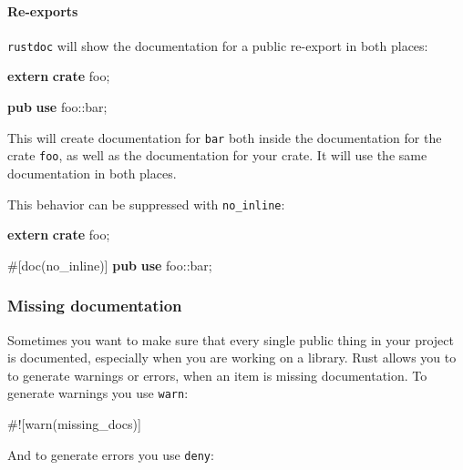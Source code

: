\documentclass[a4paper,]{book}
\newenvironment{Shaded}{\begin{snugshade}}{\end{snugshade}}
\newcommand{\KeywordTok}[1]{\textcolor[rgb]{0.13,0.29,0.53}{\textbf{{#1}}}}
\newcommand{\AttributeTok}[1]{\textcolor[rgb]{0.77,0.63,0.00}{{#1}}}
\newcommand{\NormalTok}[1]{{#1}}
\let\oldparagraph\paragraph
\renewcommand{\paragraph}[1]{\oldparagraph{#1}\mbox{}}
\begin{document}
\paragraph{Re-exports}\label{re-exports}

\texttt{rustdoc} will show the documentation for a public re-export in
both places:

\begin{Shaded}
\begin{Highlighting}[]
\KeywordTok{extern} \KeywordTok{crate} \NormalTok{foo;}

\KeywordTok{pub} \KeywordTok{use} \NormalTok{foo::bar;}
\end{Highlighting}
\end{Shaded}

This will create documentation for \texttt{bar} both inside the
documentation for the crate \texttt{foo}, as well as the documentation
for your crate. It will use the same documentation in both places.

This behavior can be suppressed with \texttt{no\_inline}:

\begin{Shaded}
\begin{Highlighting}[]
\KeywordTok{extern} \KeywordTok{crate} \NormalTok{foo;}

\AttributeTok{#[}\NormalTok{doc}\AttributeTok{(}\NormalTok{no_inline}\AttributeTok{)]}
\KeywordTok{pub} \KeywordTok{use} \NormalTok{foo::bar;}
\end{Highlighting}
\end{Shaded}

\subsubsection{Missing documentation}\label{missing-documentation}

Sometimes you want to make sure that every single public thing in your
project is documented, especially when you are working on a library.
Rust allows you to to generate warnings or errors, when an item is
missing documentation. To generate warnings you use \texttt{warn}:

\begin{Shaded}
\begin{Highlighting}[]
\AttributeTok{#![}\NormalTok{warn}\AttributeTok{(}\NormalTok{missing_docs}\AttributeTok{)]}
\end{Highlighting}
\end{Shaded}

And to generate errors you use \texttt{deny}:
\end{document}
